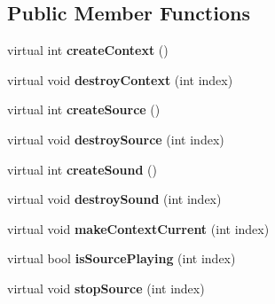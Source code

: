 \subsection*{Public Member Functions}
\begin{DoxyCompactItemize}
\item 
\hypertarget{classg2c_1_1_open_a_l_player_ade018a5363a49794a61bcd822ff9c12f}{
virtual int {\bfseries createContext} ()}
\label{classg2c_1_1_open_a_l_player_ade018a5363a49794a61bcd822ff9c12f}

\item 
\hypertarget{classg2c_1_1_open_a_l_player_ab898c98689f02f5182a0a3a0fbf193e3}{
virtual void {\bfseries destroyContext} (int index)}
\label{classg2c_1_1_open_a_l_player_ab898c98689f02f5182a0a3a0fbf193e3}

\item 
\hypertarget{classg2c_1_1_open_a_l_player_a9078ebf0bf29d4ac5065c364da711daa}{
virtual int {\bfseries createSource} ()}
\label{classg2c_1_1_open_a_l_player_a9078ebf0bf29d4ac5065c364da711daa}

\item 
\hypertarget{classg2c_1_1_open_a_l_player_af00d372566e0489daf2b1dfe0ec801c1}{
virtual void {\bfseries destroySource} (int index)}
\label{classg2c_1_1_open_a_l_player_af00d372566e0489daf2b1dfe0ec801c1}

\item 
\hypertarget{classg2c_1_1_open_a_l_player_ae2bc1c052312e2177f34192c428dc14e}{
virtual int {\bfseries createSound} ()}
\label{classg2c_1_1_open_a_l_player_ae2bc1c052312e2177f34192c428dc14e}

\item 
\hypertarget{classg2c_1_1_open_a_l_player_a62a2b612987819153ac5fb1b719bbd30}{
virtual void {\bfseries destroySound} (int index)}
\label{classg2c_1_1_open_a_l_player_a62a2b612987819153ac5fb1b719bbd30}

\item 
\hypertarget{classg2c_1_1_open_a_l_player_acdd3ad6b39141fb940c18ef88d626153}{
virtual void {\bfseries makeContextCurrent} (int index)}
\label{classg2c_1_1_open_a_l_player_acdd3ad6b39141fb940c18ef88d626153}

\item 
\hypertarget{classg2c_1_1_open_a_l_player_a80e15f9a0e5980df64d658260f32cd9c}{
virtual bool {\bfseries isSourcePlaying} (int index)}
\label{classg2c_1_1_open_a_l_player_a80e15f9a0e5980df64d658260f32cd9c}

\item 
\hypertarget{classg2c_1_1_open_a_l_player_a97eee57bb99b76ea0a3ae93d69a12d7b}{
virtual void {\bfseries stopSource} (int index)}
\label{classg2c_1_1_open_a_l_player_a97eee57bb99b76ea0a3ae93d69a12d7b}


\end{DoxyCompactItemize}
